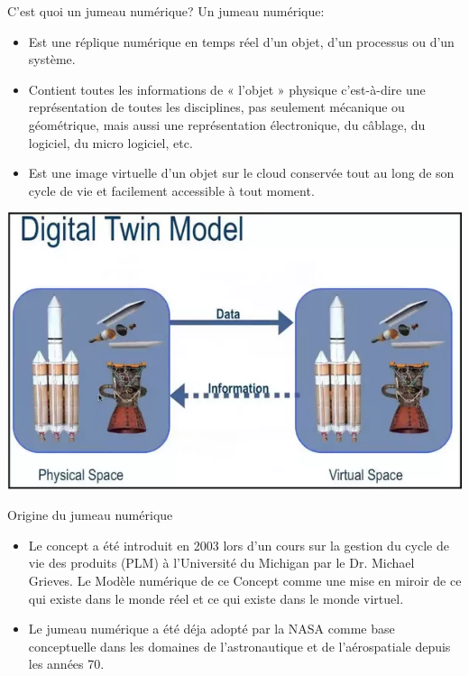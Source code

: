\documentclass{beamer}
\begin{document}
\begin{frame}{C'est quoi un jumeau numérique?}
Un jumeau numérique:
\begin{itemize}
  \item Est une réplique numérique en temps réel d'un objet, d'un processus ou d'un système.
  \item Contient toutes les informations de « l’objet » physique c’est-à-dire une représentation de toutes les disciplines, pas seulement mécanique ou géométrique, mais aussi une représentation électronique, du câblage, du
logiciel, du micro logiciel, etc.
  \item Est une image virtuelle d'un objet sur le cloud conservée tout au long de son cycle de vie et facilement 
  accessible à tout moment.
\end{itemize}

\includegraphics[scale=0.3]{images/digital_twin_auth.png} 
\vskip 1cm
%

\end{frame}
\begin{frame}{Origine du jumeau numérique}
  \begin{itemize}
    \item Le concept a été introduit en 2003 lors d’un cours sur la gestion du cycle de vie des produits (PLM) à l'Université du Michigan par le Dr. Michael Grieves. Le Modèle numérique de ce Concept comme une mise en miroir de ce qui existe dans le monde réel et ce qui existe dans le monde virtuel.
    \item Le jumeau numérique a été déja adopté par la NASA comme base conceptuelle dans les domaines de l'astronautique et de l'aérospatiale depuis les années 70.
  \end{itemize}
\end{frame}
\end{document}
